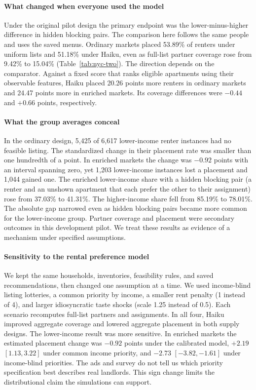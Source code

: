 \paragraph{What changed when everyone used the model}
Under the original pilot design the primary endpoint was the lower-minus-higher difference in hidden blocking pairs. The comparison here follows the same people and uses the saved menus. Ordinary markets placed 53.89\% of renters under uniform lists and 51.18\% under Haiku, even as full-list partner coverage rose from 9.42\% to 15.04\% (Table~\ref{tab:nyc-two}). The direction depends on the comparator. Against a fixed score that ranks eligible apartments using their observable features, Haiku placed 20.26 points more renters in ordinary markets and 24.47 points more in enriched markets. Its coverage differences were $-0.44$ and $+0.66$ points, respectively.

\paragraph{What the group averages conceal}
In the ordinary design, 5,425 of 6,617 lower-income renter instances had no feasible listing. The standardized change in their placement rate was smaller than one hundredth of a point. In enriched markets the change was $-0.92$ points with an interval spanning zero, yet 1,203 lower-income instances lost a placement and 1,044 gained one. The enriched lower-income share with a hidden blocking pair (a renter and an unshown apartment that each prefer the other to their assignment) rose from 37.03\% to 41.31\%. The higher-income share fell from 85.19\% to 78.01\%. The absolute gap narrowed even as hidden blocking pairs became more common for the lower-income group. Partner coverage and placement were secondary outcomes in this development pilot. We treat these results as evidence of a mechanism under specified assumptions.

\paragraph{Sensitivity to the rental preference model}
We kept the same households, inventories, feasibility rules, and saved recommendations, then changed one assumption at a time. We used income-blind listing lotteries, a common priority by income, a smaller rent penalty (1 instead of 4), and larger idiosyncratic taste shocks (scale 1.25 instead of 0.5). Each scenario recomputes full-list partners and assignments. In all four, Haiku improved aggregate coverage and lowered aggregate placement in both supply designs. The lower-income result was more sensitive. In enriched markets the estimated placement change was $-0.92$ points under the calibrated model, $+2.19$ $[1.13,3.22]$ under common income priority, and $-2.73$ $[-3.82,-1.61]$ under income-blind priorities. The ads and survey do not tell us which priority specification best describes real landlords. This sign change limits the distributional claim the simulations can support.
